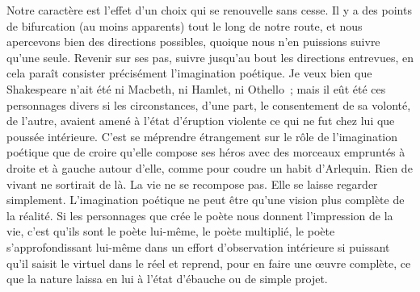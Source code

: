 
	{Notre caractère est l'effet d'un choix qui se renouvelle sans cesse.
Il y a des points de bifurcation (au moins apparents) tout le long de
notre route, et nous apercevons bien des directions possibles,
quoique nous n'en puissions suivre qu'une seule. Revenir sur ses pas,
suivre jusqu'au bout les directions entrevues, en cela paraît
consister précisément l'imagination poétique. Je veux bien que
Shakespeare n'ait été ni Macbeth, ni Hamlet, ni Othello~; mais il eût
été ces personnages divers si les circonstances, d'une part, le
consentement de sa volonté, de l'autre, avaient amené à l'état
d'éruption violente ce qui ne fut chez lui que poussée intérieure.
C'est se méprendre étrangement sur le rôle de l'imagination poétique
que de croire qu'elle compose ses héros avec des morceaux empruntés à
droite et à gauche autour d'elle, comme pour coudre un habit
d'Arlequin. Rien de vivant ne sortirait de là. La vie ne se recompose
pas. Elle se laisse regarder simplement. L'imagination poétique ne
peut être qu'une vision plus complète de la réalité. Si les
personnages que crée le poète nous donnent l'impression de la vie,
c'est qu'ils sont le poète lui-même, le poète multiplié, le poète
s'approfondissant lui-même dans un effort d'observation intérieure si
puissant qu'il saisit le virtuel dans le réel et reprend, pour en
faire une œuvre complète, ce que la nature laissa en lui à l'état
d'ébauche ou de simple projet.
}



